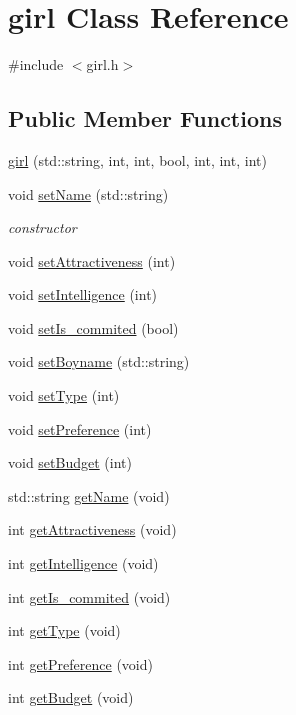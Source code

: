 \hypertarget{classgirl}{}\section{girl Class Reference}
\label{classgirl}


{\ttfamily \#include $<$girl.\+h$>$}

\subsection*{Public Member Functions}
\begin{DoxyCompactItemize}
\item 
\hyperlink{classgirl_a583ce9589214531dc92c46e9d0eebc75}{girl} (std\+::string, int, int, bool, int, int, int)
\item 
void \hyperlink{classgirl_acbf8f5cee4f0cf24df3c96fc43666b43}{set\+Name} (std\+::string)
\begin{DoxyCompactList}\small\item\em constructor \end{DoxyCompactList}\item 
void \hyperlink{classgirl_a631115234a7e2ca7b497856e32c4ee7b}{set\+Attractiveness} (int)
\item 
void \hyperlink{classgirl_a3a4c341525032ef1a9a43572ab4ab370}{set\+Intelligence} (int)
\item 
void \hyperlink{classgirl_aa02816fb19d2f81683b5fe75729eacb1}{set\+Is\+\_\+commited} (bool)
\item 
void \hyperlink{classgirl_a761660d73115bf5940576daab5719aff}{set\+Boyname} (std\+::string)
\item 
void \hyperlink{classgirl_a85b694210361853ec1fee3f232491009}{set\+Type} (int)
\item 
void \hyperlink{classgirl_afdd10cabb120b9bbc44c8c243168baf3}{set\+Preference} (int)
\item 
void \hyperlink{classgirl_aabb69c46aef35ff020d90d3b28300f98}{set\+Budget} (int)
\item 
std\+::string \hyperlink{classgirl_ae0499077a33b4a517867f431bccfe93a}{get\+Name} (void)
\item 
int \hyperlink{classgirl_a25c8b2bc2d3df50ca61417f0e8c4eef5}{get\+Attractiveness} (void)
\item 
int \hyperlink{classgirl_a7cd49c129d9ede212cf24a0d93bfcc6a}{get\+Intelligence} (void)
\item 
int \hyperlink{classgirl_aa1565f1f255770e69de297bb631a4ed8}{get\+Is\+\_\+commited} (void)
\item 
int \hyperlink{classgirl_ac0eb402f33a9b066a89ae0eeda483ea4}{get\+Type} (void)
\item 
int \hyperlink{classgirl_a445487f05d077114171887781a12e151}{get\+Preference} (void)
\item 
int \hyperlink{classgirl_aff71d37b752b3501114356f862ae91a3}{get\+Budget} (void)
\end{DoxyCompactItemize}
